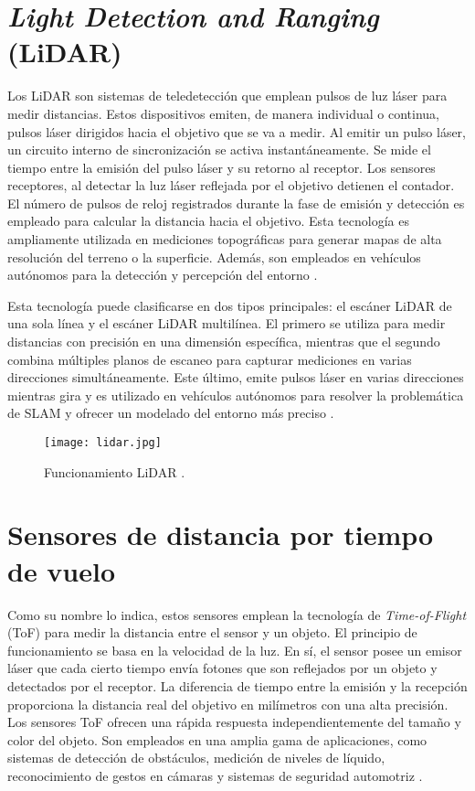 \section{\textit{Light Detection and Ranging} (LiDAR)}
Los LiDAR son sistemas de teledetección que emplean pulsos de luz láser para medir distancias. Estos dispositivos emiten, de manera individual o continua, pulsos láser dirigidos hacia el objetivo que se va a medir. Al emitir un pulso láser, un circuito interno de sincronización se activa instantáneamente. Se mide el tiempo entre la emisión del pulso láser y su retorno al receptor. Los sensores receptores, al detectar la luz láser reflejada por el objetivo detienen el contador. El número de pulsos de reloj registrados durante la fase de emisión y detección es empleado para calcular la distancia hacia el objetivo. Esta tecnología es ampliamente utilizada en mediciones topográficas para generar mapas de alta resolución del terreno o la superficie. Además, son empleados en vehículos autónomos para la detección y percepción del entorno \cite{lidar}.

Esta tecnología puede clasificarse en dos tipos principales: el escáner LiDAR de una sola línea y el escáner LiDAR multilínea. El primero se utiliza para medir distancias con precisión en una dimensión específica, mientras que el segundo combina múltiples planos de escaneo para capturar mediciones en varias direcciones simultáneamente. Este último, emite pulsos láser en varias direcciones mientras gira y es utilizado en vehículos autónomos para resolver la problemática de SLAM y ofrecer un modelado del entorno más preciso \cite{lidar}.

\begin{figure}[H]
	\centering
	\texttt{[image: lidar.jpg]}
	\caption{Funcionamiento LiDAR \cite{lidar}.}
	\label{fig:lidar}
\end{figure}

\section{Sensores de distancia por tiempo de vuelo}
Como su nombre lo indica, estos sensores emplean la tecnología de \textit{Time-of-Flight} (ToF) para medir la distancia entre el sensor y un objeto. El principio de funcionamiento se basa en la velocidad de la luz. En sí, el sensor posee un emisor láser que cada cierto tiempo envía fotones que son reflejados por un objeto y detectados por el receptor. La diferencia de tiempo entre la emisión y la recepción proporciona la distancia real del objetivo en milímetros con una alta precisión. Los  sensores ToF ofrecen una rápida respuesta independientemente del tamaño y color del objeto. Son empleados en una amplia gama de aplicaciones, como sistemas de detección de obstáculos, medición de niveles de líquido, reconocimiento de gestos en cámaras y sistemas de seguridad automotriz \cite{tof}.


